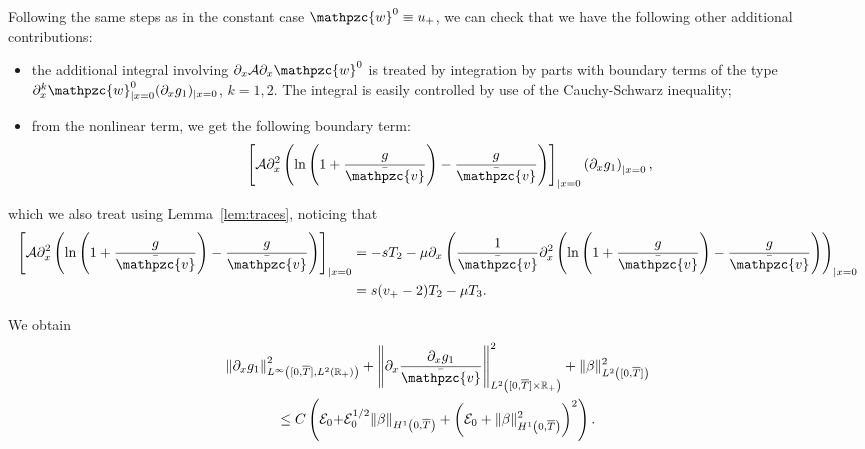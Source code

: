 \documentclass[AHL,Unicode,longabstracts,published]{cedram}
\newcommand{\R}{\mathbb{R}}
\newcommand{\p}{\partial}
\newcommand{\bv}{\bar{\mathpzc{v}}}
\newcommand{\cA}{\mathcal A}
\newcommand{\cE}{\mathcal E}
\newcommand{\tw}{\mathpzc{w}}
\begin{document}
Following the same steps as in the constant case $\tw^0 \equiv u_+$, we can check that we have the following other additional contributions:
\begin{itemize}
\item the additional integral involving $\partial_x \cA \partial_x \tw^0$ is treated by integration by parts with boundary terms of the type $\partial^k_x \tw^0_{|x=0} (\partial_x g_1)_{|x=0}$, $k=1,2$. The integral is easily controlled by use of the Cauchy-Schwarz inequality;
\item from the nonlinear term, we get the following boundary term:
\[
\left[\cA \partial^2_x \left(\ln \left(1+ \frac{g}{\bv}\right) - \frac{g}{\bv} \right) \right]_{|x=0} \left(\partial_x g_1\right)_{|x=0},
\]
\end{itemize}
which we also treat using Lemma~\ref{lem:traces}, noticing that
\begin{equation}\label{trace-A-dx2-NL}
\begin{split}
\left[\cA \partial^2_x \left(\ln \left(1+ \frac{g}{\bv}\right) - \frac{g}{\bv} \right) \right]_{|x=0}&=-s T_2 -\mu\p_x\left(\frac{1}{\bv}
\partial^2_x \left(\ln \left(1+ \frac{g}{\bv}\right) - \frac{g}{\bv} \right)\right)_{|x=0}\\
&=s(v_+-2)T_2-\mu T_3.
\end{split}
\end{equation}

We obtain
\begin{multline*}
\left\|\p_x g_1\right\|_{L^\infty\left([0,\overline{T}], L^2(\mathbb R_+)\right)}^2 + \left\|\p_x \frac{\p_x g_1}{\bv}\right\|^2_{L^2\left([0,\overline{T}]\times \R_+\right)}+ \|\beta\|_{L^2\left([0,\overline{T}]\right)}^2\\
\leq C\left(\cE_0 {+\cE_0^{1/2}\|\beta\|_{H^1\left(0,\overline{T}\right)}} +\left(\cE_0 + \|\beta\|_{H^1\left(0,\overline{T}\right)}^2\right)^2 \right).
\end{multline*}



\end{document}

